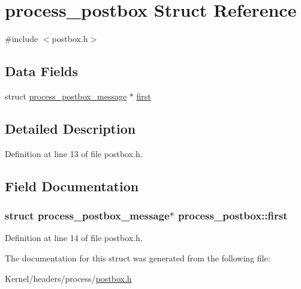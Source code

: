 \hypertarget{structprocess__postbox}{
\section{process\_\-postbox Struct Reference}
\label{structprocess__postbox}
}


{\ttfamily \#include $<$postbox.h$>$}

\subsection*{Data Fields}
\begin{DoxyCompactItemize}
\item 
struct \hyperlink{structprocess__postbox__message}{process\_\-postbox\_\-message} $\ast$ \hyperlink{structprocess__postbox_aff8383f7249211b3ae9d536a03c10bda}{first}
\end{DoxyCompactItemize}


\subsection{Detailed Description}


Definition at line 13 of file postbox.h.



\subsection{Field Documentation}
\hypertarget{structprocess__postbox_aff8383f7249211b3ae9d536a03c10bda}{
\subsubsection[{first}]{\setlength{\rightskip}{0pt plus 5cm}struct {\bf process\_\-postbox\_\-message}$\ast$ {\bf process\_\-postbox::first}}}
\label{structprocess__postbox_aff8383f7249211b3ae9d536a03c10bda}


Definition at line 14 of file postbox.h.



The documentation for this struct was generated from the following file:\begin{DoxyCompactItemize}
\item 
Kernel/headers/process/\hyperlink{postbox_8h}{postbox.h}\end{DoxyCompactItemize}
